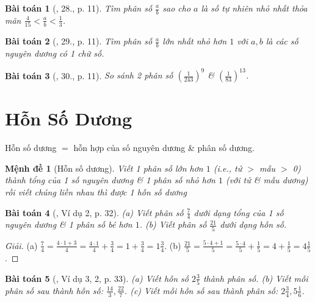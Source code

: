 \documentclass{article}
\newtheorem{baitoan}{Bài toán}
\newtheorem{menhde}{Mệnh đề}
\begin{document}
\begin{baitoan}[\cite{Binh_Toan_6_tap_2}, 28., p. 11]
	Tìm phân số $\frac{a}{b}$ sao cho $a$ là số tự nhiên nhỏ nhất thỏa mãn $\frac{4}{15} < \frac{a}{b} < \frac{1}{3}$.
\end{baitoan}

\begin{baitoan}[\cite{Binh_Toan_6_tap_2}, 29., p. 11]
	Tìm phân số $\frac{a}{b}$ lớn nhất nhỏ hơn $1$ với $a,b$ là các số nguyên dương có 1 chữ số.
\end{baitoan}

\begin{baitoan}[\cite{Binh_Toan_6_tap_2}, 30., p. 11]
	So sánh 2 phân số $\left(\frac{1}{243}\right)^9$ \& $\left(\frac{1}{83}\right)^{13}$.
\end{baitoan}


\section{Hỗn Số Dương}
Hỗn số dương $=$ hỗn hợp của số nguyên dương \& phân số dương.

\begin{menhde}[Hỗn số dương]
	Viết 1 phân số lớn hơn $1$ (i.e., tử $>$ mẫu $>$ 0) thành tổng của 1 số nguyên dương \& 1 phân số nhỏ hơn $1$ (với tử \& mẫu dương) rồi viết chúng liền nhau thì được 1 \emph{hỗn số dương}
\end{menhde}

\begin{baitoan}[\cite{Binh_Toan_6_tap_2}, Ví dụ 2, p. 32]
	(a) Viết phân số $\frac{7}{4}$ dưới dạng tổng của 1 số nguyên dương \& 1 phân số bé hơn $1$. (b) Viết phân số $\frac{21}{5}$ dưới dạng hỗn số.
\end{baitoan}

\begin{proof}[Giải]
	(a) $\frac{7}{4} = \frac{4\cdot1 + 3}{4} = \frac{4\cdot1}{4} + \frac{3}{4} = 1 + \frac{3}{4} = 1\frac{3}{4}$. (b) $\frac{21}{5} = \frac{5\cdot4 + 1}{5} = \frac{5\cdot4}{5} + \frac{1}{5} = 4 + \frac{1}{5} = 4\frac{1}{5}$.
\end{proof}

\begin{baitoan}[\cite{Binh_Toan_6_tap_2}, Ví dụ 3, 2, p. 33]
	(a) Viết hỗn số $2\frac{3}{5}$ thành phân số. (b) Viết mỗi phân số sau thành hỗn số: $\frac{14}{3},\frac{22}{7}$. (c) Viết mỗi hỗn số sau thành phân số: $2\frac{3}{4},5\frac{1}{6}$.
\end{baitoan}
\end{document}

